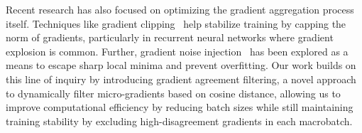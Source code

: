 
Recent research has also focused on optimizing the gradient aggregation process itself. Techniques like gradient clipping~\cite{pascanu2013difficultytrainingrecurrentneural} help stabilize training by capping the norm of gradients, particularly in recurrent neural networks where gradient explosion is common. Further, gradient noise injection~\cite{neelakantan2015addinggradientnoiseimproves} has been explored as a means to escape sharp local minima and prevent overfitting. Our work builds on this line of inquiry by introducing gradient agreement filtering, a novel approach to dynamically filter micro-gradients based on cosine distance, allowing us to improve computational efficiency by reducing batch sizes while still maintaining training stability by excluding high-disagreement gradients in each macrobatch.
